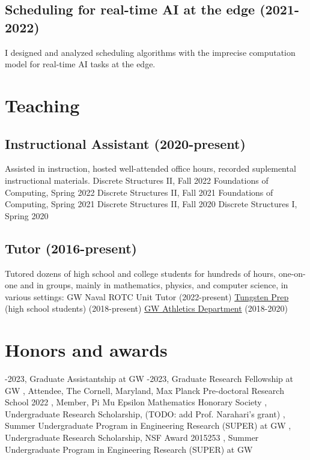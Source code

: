\documentclass[letterpaper]{article}
\begin{document}
\subsection*{Scheduling for real-time AI at the edge (2021-2022)}
I designed and analyzed scheduling algorithms with the imprecise computation model for real-time AI tasks at the edge. 

\section*{Teaching}
\subsection*{Instructional Assistant (2020-present)}
Assisted in instruction, hosted well-attended office hours, recorded suplemental instructional materials.
\subsubitem
Discrete Structures II, Fall 2022
\subsubitem
Foundations of Computing, Spring 2022
\subsubitem
Discrete Structures II, Fall 2021
\subsubitem
Foundations of Computing, Spring 2021
\subsubitem
Discrete Structures II, Fall 2020
\subsubitem
Discrete Structures I, Spring 2020

\subsection*{Tutor (2016-present)}
Tutored dozens of high school and college students for hundreds of hours, one-on-one and in groups, mainly in mathematics, physics, and computer science, in various settings:
\subitem 
GW Naval ROTC Unit Tutor (2022-present)
\subitem
\href{https://www.tungstenprep.com/}{Tungsten Prep} (high school students) (2018-present) 
\subitem
\href{https://gwsports.com/sports/2018/7/23/school-bio-academic-support-tutor-info-html.aspx}{GW Athletics Department} (2018-2020) 

\section*{Honors and awards}

-2023, Graduate Assistantship at GW
-2023, Graduate Research Fellowship at GW
, Attendee, The Cornell, Maryland, Max Planck Pre-doctoral Research School 2022
, Member, Pi Mu Epsilon Mathematics Honorary Society
, Undergraduate Research Scholarship, (TODO: add Prof. Narahari's grant)
, Summer Undergraduate Program in Engineering Research (SUPER) at GW
, Undergraduate Research Scholarship, NSF Award 2015253
, Summer Undergraduate Program in Engineering Research (SUPER) at GW
\end{document}
